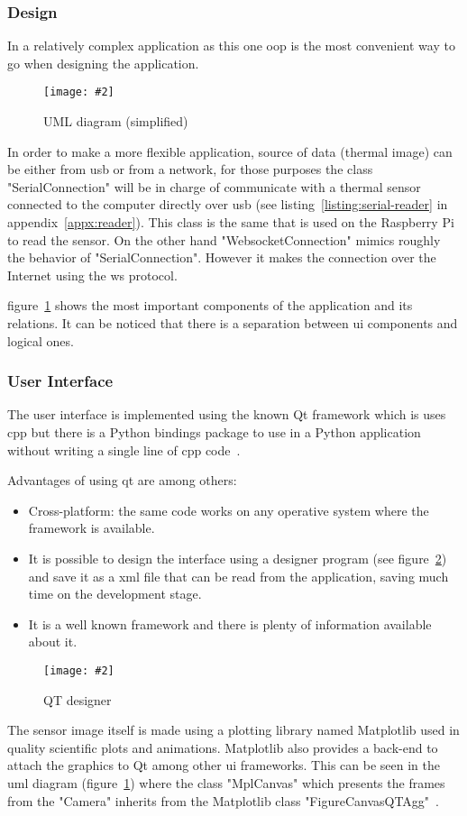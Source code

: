 \documentclass[hidelinks,11pt,a4paper,oneside,article]{memoir}
\newcommand{\putimage}[3][10] %
{
\begin{figure}[h]
	\centering
	\captionsetup{justification=centering}
	\texttt{[image: \#2]}
	\caption{#3}
	\label{fig:#2}
\end{figure}
}
\begin{document}
\subsubsection{Design}
In a relatively complex application as this one  \gls{oop} is the most convenient way to go when designing the application.

    \putimage[15]{python-uml}{UML diagram (simplified)}
    
In order to make a more flexible application, source of data (thermal image) can be either from \gls{usb} or from  a network, for those purposes the class "SerialConnection" will be in charge of communicate with a thermal sensor connected to the computer directly over \gls{usb} (see listing~\ref{listing:serial-reader} in appendix~\ref{appx:reader}). This class is the same that is used on the Raspberry Pi to read the sensor. On the other hand "WebsocketConnection" mimics roughly the behavior of "SerialConnection". However it makes the connection over the Internet using the \gls{ws} protocol.
    
figure~\ref{fig:python-uml}  shows the most important components of the application and its relations. It can be noticed that there is a separation between \gls{ui} components and logical ones.

\subsubsection{User Interface}
The user interface is implemented using the known Qt framework which is uses \gls{cpp} but there is a Python bindings package to use in a Python application without writing a single line of \gls{cpp} code~\cite{riverbank}.

Advantages of using qt are among others:
\begin{itemize}
    \item Cross-platform: the same code works on any operative system where the framework is available.
    \item It is possible to design the interface using a designer program (see figure~\ref{fig:qt-designer}) and save it as a \gls{xml} file that can be read from the application, saving much time on the development stage.
    \item It is a well known framework and there is plenty of information available about it.
\end{itemize}

    \putimage{qt-designer}{QT designer}

The sensor image itself is made using a plotting library named Matplotlib used in quality scientific plots and animations. Matplotlib  also provides a back-end to attach the graphics to Qt among other \gls{ui} frameworks. This can be seen in the \gls{uml} diagram (figure~\ref{fig:python-uml}) where the class "MplCanvas" which presents the frames from the "Camera" inherits from the Matplotlib class "FigureCanvasQTAgg"~\cite{matplotlibqt4agg}.
\end{document}
